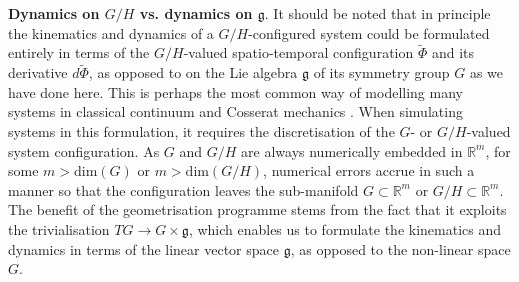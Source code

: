 \textbf{Dynamics on $G/H$ vs. dynamics on $\mathfrak{g}$}. It should be noted that in principle the kinematics and dynamics of a $G/H$-configured system could be formulated entirely in terms of the $G/H$-valued spatio-temporal configuration $\tilde{\Phi}$ and its derivative $d \tilde{\Phi}$, as opposed to on the Lie algebra $\mathfrak{g}$ of its symmetry group $G$ as we have done here. This is perhaps the most common way of modelling many systems in classical continuum and Cosserat mechanics \citep{naughtonElasticaCompliantMechanics2021, powersDynamicsFilamentsMembranes2010, stefanouThreedimensionalCosseratHomogenization2008, caoNonlinearDynamicsElastic2008}. When simulating systems in this formulation, it requires the discretisation of the $G$- or $G/H$-valued system configuration. As $G$ and $G/H$ are always numerically embedded in $\mathbb{R}^m$, for some $m > \text{dim}(G)$ or $m > \text{dim}(G/H)$, numerical errors accrue in such a manner so that the configuration leaves the sub-manifold $G \subset \mathbb{R}^m$ or $G/H \subset \mathbb{R}^m$. The benefit of the geometrisation programme stems from the fact that it exploits the trivialisation $TG \to G \times \mathfrak{g}$, which enables us to formulate the kinematics and dynamics in terms of the linear vector space $\mathfrak{g}$, as opposed to the non-linear space $G$.

